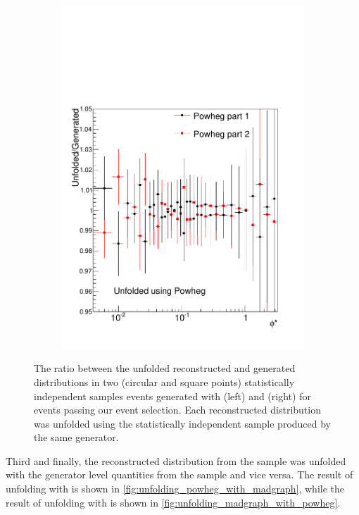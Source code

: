 \begin{figure}[!htbp]
\begin{subfigure}[b]{\SideBySidePlotWidth}
        \includegraphics[width=\textwidth]{figures/BinM_P1P2.pdf}
        \caption{}
        \label{fig:unfolding_powheg_with_powheg_halves}
    \end{subfigure}
    \caption[
        The ratio of reconstructed over generated \phistar in MC unfolded with
        independent samples.
    ]{
        The ratio between the unfolded reconstructed and generated \phistar
        distributions in two (circular and square points) statistically
        independent samples events generated with \MADGRAPH (left) and \POWHEG
        (right) for events passing our event selection. Each reconstructed
        \phistar distribution was unfolded using the statistically independent
        sample produced by the same generator.
    }
    \label{fig:half_vs_half_unfolding}
\end{figure}

Third and finally, the reconstructed \phistar distribution from the \MADGRAPH
sample was unfolded with the generator level quantities from the \POWHEG sample
and vice versa. The result of unfolding \POWHEG with \MADGRAPH is shown in
\cref{fig:unfolding_powheg_with_madgraph}, while the result of unfolding
\MADGRAPH with \POWHEG is shown in
\cref{fig:unfolding_madgraph_with_powheg}.

